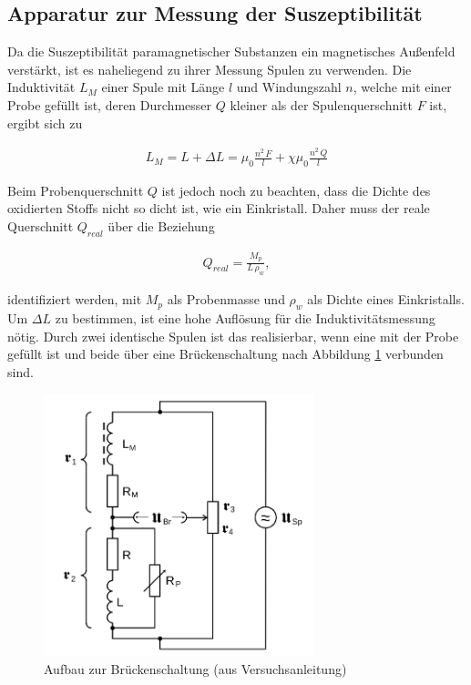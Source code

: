 \subsection{Apparatur zur Messung der Suszeptibilität}
Da die Suszeptibilität paramagnetischer Substanzen ein magnetisches Außenfeld verstärkt, ist es naheliegend zu ihrer Messung Spulen zu verwenden.
Die Induktivität $L_M$ einer Spule mit Länge $l$ und Windungszahl $n$, welche mit einer Probe gefüllt ist, deren Durchmesser $Q$ kleiner 
als der Spulenquerschnitt $F$ ist, ergibt sich zu

\begin{align}
 L_M = L + \Delta L = \mu_0 \frac{n^2 \,F}{l} + \chi \mu_0\frac {n^2 \, Q}{l}
 \label{eqIndu}
\end{align}

Beim Probenquerschnitt $Q$ ist jedoch noch zu beachten, dass die Dichte des oxidierten Stoffs nicht so dicht ist, wie ein Einkristall. 
Daher muss der reale Querschnitt $Q_{real}$ über die Beziehung

\begin{align}
 Q_{real} = \frac{M_p}{L \, \rho_w},
\end{align}

identifiziert werden, mit $M_p$ als Probenmasse und $\rho_w$ als Dichte eines Einkristalls. Um $\Delta L$ zu bestimmen, ist eine hohe
Auflösung für die Induktivitätsmessung nötig. Durch zwei identische Spulen ist das realisierbar, wenn eine mit der Probe gefüllt ist und
beide über eine Brückenschaltung nach Abbildung \ref{picBruecke} verbunden sind.

\begin{figure}[H]
 \includegraphics[width=0.7\textwidth]{pics/bruecke.png}
 \caption{Aufbau zur Brückenschaltung (aus Versuchsanleitung)}
 \label{picBruecke}
\end{figure}

